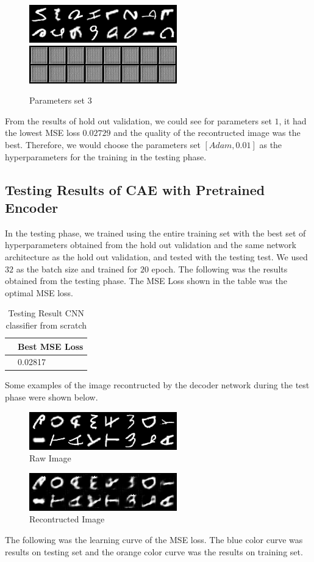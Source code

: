 \documentclass{article}
\begin{document}
\begin{figure}[h]
	\centering
	\includegraphics[scale=0.9]{val_raw_round3.png}
	\includegraphics[scale=0.9]{val_recond_round3.png}
	\caption{Parameters set 3}
\end{figure}

\pagebreak

From the results of hold out validation, we could see for parameters set $1$, it had the lowest MSE loss $0.02729$ and the quality of the recontructed image was the best. Therefore, we would choose the parameters set $[Adam, 0.01]$ as the hyperparameters for the training in the testing phase.

\subsection{Testing Results of CAE with Pretrained Encoder}

In the testing phase, we trained using the entire training set with the best set of hyperparameters obtained from the hold out validation and the same network architecture as the hold out validation, and tested with the testing test. We used $32$ as the batch size and trained for $20$ epoch. The following was the results obtained from the testing phase. The MSE Loss shown in the table was the optimal MSE loss.

\begin{table}[htb]
\caption{Testing Result CNN classifier from scratch}
	\label{sample-table}
	\centering
\begin{tabular}{ll}
\toprule
		\cmidrule{1-2}
		& Best MSE Loss	\\
	\midrule
 	& 0.02817 \\
\bottomrule
\end{tabular}
\end{table}

Some examples of the image recontructed by the decoder network during the test phase were shown below.

\pagebreak

\begin{figure}[h]
  \centering
  \includegraphics[scale=0.9]{test_raw_image.png}
  \caption{Raw Image}
\end{figure}

\begin{figure}[h]
  \centering
  \includegraphics[scale=0.9]{test_recond_image.png}
  \caption{Recontructed Image}
\end{figure}

The following was the learning curve of the MSE loss. The blue color curve was results on testing set and the orange color curve was the results on training set. 
\end{document}
